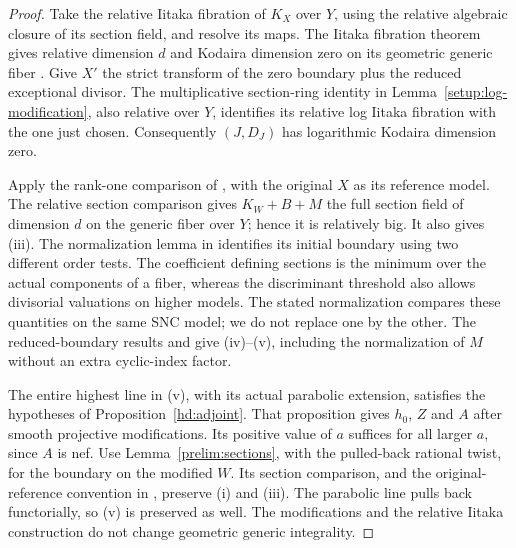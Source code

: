 \begin{proof}
Take the relative Iitaka fibration of $K_X$ over $Y$, using the
relative algebraic closure of its section field, and resolve its
maps. The Iitaka fibration theorem gives relative dimension $d$
and Kodaira dimension zero on its geometric generic fiber
\cite[Section~6]{IitakaOriginal}. Give $X'$ the strict transform of
the zero boundary plus the reduced exceptional divisor. The
multiplicative section-ring identity in
Lemma~\ref{setup:log-modification}, also relative over $Y$, identifies
its relative log Iitaka fibration with the one just chosen.
Consequently $(J,D_J)$ has logarithmic Kodaira dimension zero.

Apply the rank-one comparison of \cite[\PoneSectionComparison]{SubadditivityCompanion}, with the original $X$
as its reference model. The relative section comparison gives
$K_W+B+M$ the full section field of dimension $d$ on the generic
fiber over $Y$; hence it is relatively big. It also gives (iii).
The normalization lemma in \cite[\PoneNormalization]{SubadditivityCompanion}
identifies its initial boundary using two different order tests.
The coefficient defining sections is the minimum over the actual
components of a fiber, whereas the discriminant threshold also
allows divisorial valuations on higher models. The stated
normalization compares these quantities on the same SNC model;
we do not replace one by the other. The reduced-boundary results \cite[\PoneReducedRoot]{SubadditivityCompanion} and
\cite[\PoneReducedModuli]{SubadditivityCompanion} give (iv)--(v), including
the normalization of $M$ without an extra cyclic-index factor.

The entire highest line in (v), with its actual parabolic
extension, satisfies the hypotheses of Proposition~\ref{hd:adjoint}.
That proposition gives $h_0$, $Z$ and $A$ after smooth projective
modifications. Its positive value of $a$ suffices for all
larger $a$, since $A$ is nef. Use
Lemma~\ref{prelim:sections}, with the pulled-back rational twist, for the boundary on the modified
$W$. Its section comparison, and the original-reference convention
in \cite[\PoneSectionComparison]{SubadditivityCompanion}, preserve (i) and (iii).
The parabolic line pulls back functorially, so (v) is preserved as
well. The modifications and the relative Iitaka construction do not
change geometric generic integrality.
\end{proof}

